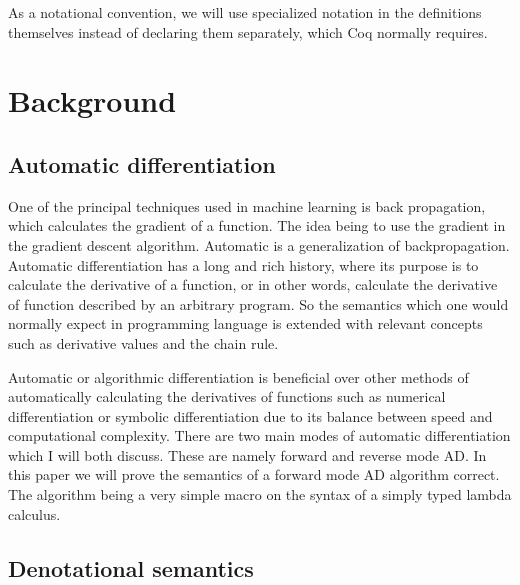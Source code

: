 \documentclass[a4, 12pt, final]{article}
\begin{document}

As a notational convention, we will use specialized notation in the definitions themselves instead of declaring them separately, which Coq normally requires.

\section{Background}

\subsection{Automatic differentiation}


One of the principal techniques used in machine learning is back propagation, which calculates the gradient of a function.
The idea being to use the gradient in the gradient descent algorithm\cite{Baydin2015AutomaticDI}.
Automatic is a generalization of backpropagation.
Automatic differentiation has a long and rich history, where its purpose is to calculate the derivative of a function, or in other words, calculate the derivative of function described by an arbitrary program.
So the semantics which one would normally expect in programming language is extended with relevant concepts such as derivative values and the chain rule.

Automatic or algorithmic differentiation is beneficial over other methods of automatically calculating the derivatives of functions such as numerical differentiation or symbolic differentiation due to its balance between speed and computational complexity.
There are two main modes of automatic differentiation which I will both discuss.
These are namely forward and reverse mode AD.
In this paper we will prove the semantics of a forward mode AD algorithm correct.
The algorithm being a very simple macro on the syntax of a simply typed lambda calculus.


\subsection{Denotational semantics}
\end{document}
